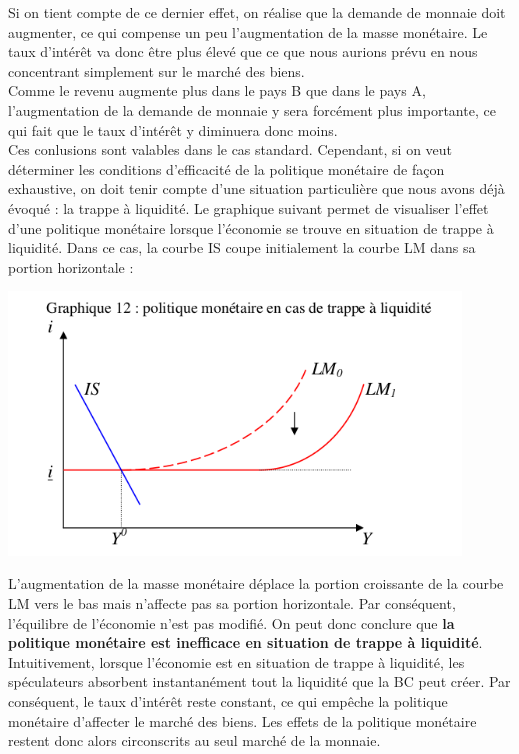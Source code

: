 \documentclass[10pt]{book}
\begin{document}
Si on tient compte de ce dernier effet, on réalise que la demande de monnaie doit augmenter, ce qui compense un peu l'augmentation de la masse monétaire. Le taux d'intérêt va donc être plus élevé que ce que nous aurions prévu en nous concentrant simplement sur le marché des biens. \\
Comme le revenu augmente plus dans le pays B que dans le pays A, l'augmentation de la demande de monnaie y sera forcément plus importante, ce qui fait que le taux d'intérêt y diminuera donc moins. \\
Ces conlusions sont valables dans le cas standard. Cependant, si on veut déterminer les conditions d'efficacité de la politique monétaire de façon exhaustive, on doit tenir compte d'une situation particulière que nous avons déjà évoqué : la trappe à liquidité. Le graphique suivant permet de visualiser l'effet d'une politique monétaire lorsque l'économie se trouve en situation de trappe à liquidité. Dans ce cas, la courbe IS coupe initialement la courbe LM dans sa portion horizontale : \begin{center}
  \includegraphics[width=12cm]{graph36.png}
\end{center}
L'augmentation de la masse monétaire déplace la portion croissante de la courbe LM vers le bas mais n'affecte pas sa portion horizontale. Par conséquent, l'équilibre de l'économie n'est pas modifié. On peut donc conclure que \textbf{la politique monétaire est inefficace en situation de trappe à liquidité}. \\
Intuitivement, lorsque l'économie est en situation de trappe à liquidité, les spéculateurs absorbent instantanément tout la liquidité que la BC peut créer. Par conséquent, le taux d'intérêt reste constant, ce qui empêche la politique monétaire d'affecter le marché des biens. Les effets de la politique monétaire restent donc alors circonscrits au seul marché de la monnaie.
\end{document}
